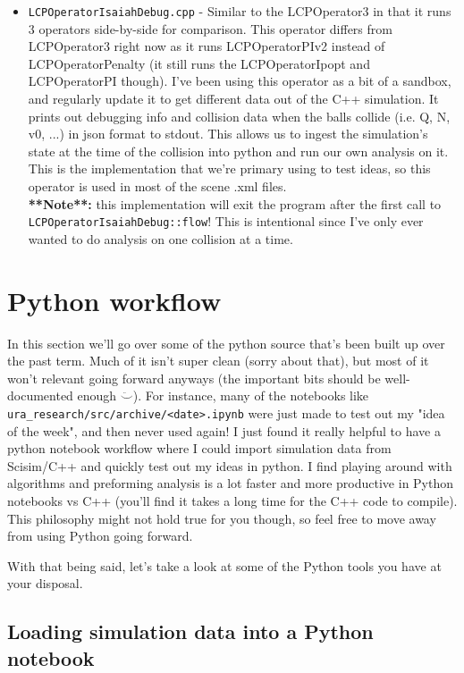 \documentclass[12pt]{article}
\begin{document}
\begin{itemize}{}{\setlength{\leftmargin}{0.25cm}}
    \item \texttt{LCPOperatorIsaiahDebug.cpp} -
    Similar to the LCPOperator3 in that it runs 3 operators side-by-side for comparison.
    This operator differs from LCPOperator3 right now as it runs LCPOperatorPIv2 instead of LCPOperatorPenalty
    (it still runs the LCPOperatorIpopt and LCPOperatorPI though).
    I've been using this operator as a bit of a sandbox, and regularly update it to get different data out of the C++ simulation.
    It prints out debugging info and collision data when the balls collide (i.e. Q, N, v0, ...) in json format to stdout.
    This allows us to ingest the simulation's state at the time of the collision into python and run our own analysis on it.
    This is the implementation that we're primary using to test ideas, so this operator is used in most of the scene .xml files.
    \\\textbf{**Note**:} this implementation will exit the program after the first call to \texttt{LCPOperatorIsaiahDebug::flow}!
    This is intentional since I've only ever wanted to do analysis on one collision at a time.
\end{itemize}


\section{Python workflow}

In this section we'll go over some of the python source that's been built up over the past term.
Much of it isn't super clean (sorry about that), but most of it won't relevant going forward anyways
(the important bits should be well-documented enough $\ddot\smile$).
For instance, many of the notebooks like \texttt{ura\_research/src/archive/<date>.ipynb}
were just made to test out my "idea of the week", and then never used again!
I just found it really helpful to have a python notebook workflow
where I could import simulation data from Scisim/C++ and quickly test out my ideas in python.
I find playing around with algorithms and preforming analysis is a lot faster and more productive in Python notebooks vs C++
(you'll find it takes a long time for the C++ code to compile).
This philosophy might not hold true for you though, so feel free to move away from using Python going forward.

With that being said, let's take a look at some of the Python tools you have at your disposal.

\subsection{Loading simulation data into a Python notebook}
\end{document}
